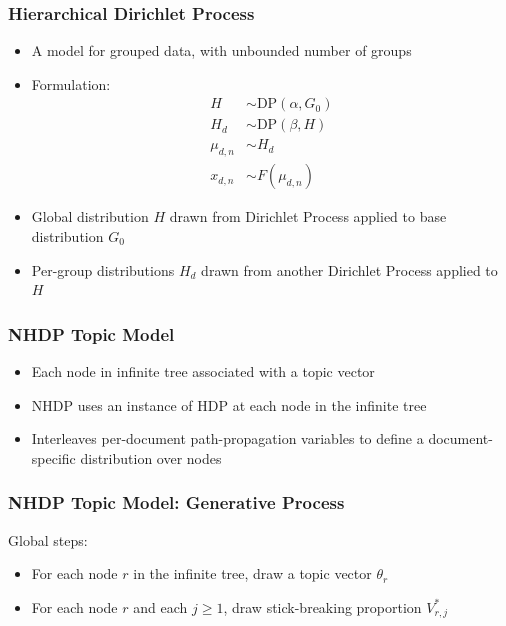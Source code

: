 \begin{frame}
\frametitle{Hierarchical Dirichlet Process}
\begin{itemize}[<+->]
\item A model for grouped data, with unbounded number of groups
\item Formulation:
\begin{align*}
H &\sim \text{DP}(\alpha, G_0) \\
H_d &\sim \text{DP}(\beta, H) \\
\mu_{d,n} &\sim H_d \\
x_{d,n} &\sim F(\mu_{d,n})
\end{align*}
\item Global distribution $H$ drawn from Dirichlet Process applied to base distribution $G_0$
\item Per-group distributions $H_d$ drawn from another Dirichlet Process applied to $H$
\end{itemize}
\end{frame}

\begin{frame}
\frametitle{NHDP Topic Model}
\begin{itemize}[<+->]
\item Each node in infinite tree associated with a topic vector
\item NHDP uses an instance of HDP at each node in the infinite tree
\item Interleaves per-document path-propagation variables to define a document-specific distribution over nodes
\end{itemize}
\end{frame}

\begin{frame}
\frametitle{NHDP Topic Model: Generative Process}
Global steps:
\begin{itemize}[<+->]
\item For each node $r$ in the infinite tree, draw a topic vector $\theta_r$
\item For each node $r$ and each $j \geq 1$, draw stick-breaking proportion $V^*_{r,j}$
\end{itemize}
\end{frame}

